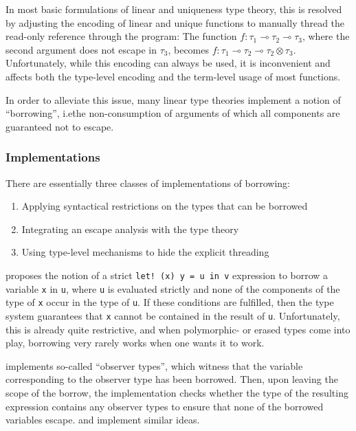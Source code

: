 In most basic formulations of linear and uniqueness type theory, this is resolved by adjusting the encoding of linear and unique functions to manually thread the read-only reference through the program: The function $f : \tau_1 \multimap \tau_2 \multimap \tau_3$, where the second argument does not escape in $\tau_3$, becomes $f : \tau_1 \multimap \tau_2 \multimap \tau_2 \otimes \tau_3$. Unfortunately, while this encoding can always be used, it is inconvenient and affects both the type-level encoding and the term-level usage of most functions. 

In order to alleviate this issue, many linear type theories implement a notion of ``borrowing'', i.e\. the non-consumption of arguments of which all components are guaranteed not to escape. 

\subsubsection{Implementations}
There are essentially three classes of implementations of borrowing:
\begin{enumerate}
	\item Applying syntactical restrictions on the types that can be borrowed \citep{wadler_linear_1990}
	\item Integrating an escape analysis with the type theory \citep{goos_observers_1992}\citep{kobayashi_quasi-linear_1999}\citep{goos_another_2002}
	\item Using type-level mechanisms to hide the explicit threading \citep{spiwack_linearly_2022}
\end{enumerate}

\cite{wadler_linear_1990} proposes the notion of a strict \lstinline|let! (x) y = u in v| expression to borrow a variable \verb|x| in \verb|u|, where \verb|u| is evaluated strictly and none of the components of the type of \verb|x| occur in the type of \verb|u|. If these conditions are fulfilled, then the type system guarantees that \verb|x| cannot be contained in the result of \verb|u|. Unfortunately, this is already quite restrictive, and when polymorphic- or erased types come into play, borrowing very rarely works when one wants it to work.

\cite{goos_observers_1992} implements so-called ``observer types'', which witness that the variable corresponding to the observer type has been borrowed. Then, upon leaving the scope of the borrow, the implementation checks whether the type of the resulting expression contains any observer types to ensure that none of the borrowed variables escape. \cite{goos_another_2002} and \cite{kobayashi_quasi-linear_1999} implement similar ideas.

